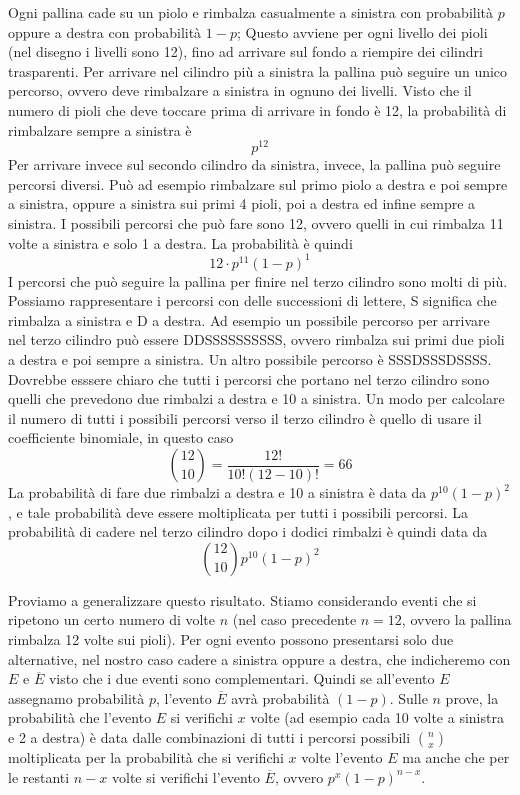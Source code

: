 Ogni pallina cade su un piolo e rimbalza casualmente a sinistra con 
probabilità \(p\) oppure a destra con probabilità \(1-p\); Questo avviene per 
ogni livello dei pioli (nel disegno i livelli sono 12), fino ad arrivare sul 
fondo a riempire dei cilindri trasparenti.
Per arrivare nel cilindro più a sinistra la pallina può seguire un unico 
percorso, ovvero deve rimbalzare a sinistra in ognuno dei livelli. 
Visto che il numero di pioli che deve toccare prima di arrivare in fondo è 
12, la probabilità di rimbalzare sempre a sinistra è \[p^{12}\]
Per arrivare invece sul secondo cilindro da sinistra, invece, la pallina può 
seguire percorsi diversi. Può ad esempio rimbalzare sul primo piolo a destra 
e poi sempre a sinistra, oppure a sinistra sui primi 4 pioli, poi a destra ed 
infine sempre a sinistra. I possibili percorsi che può fare sono 12, ovvero 
quelli in cui rimbalza 11 volte a sinistra e solo 1 a destra. La probabilità 
è quindi
\[12 \cdot p^{11}(1-p)^1\]
I percorsi che può seguire la pallina per finire nel terzo cilindro sono 
molti di più. Possiamo rappresentare i percorsi con delle successioni di 
lettere, S significa che rimbalza a sinistra e D a destra. Ad esempio un 
possibile percorso per arrivare nel terzo cilindro può essere
DDSSSSSSSSSS, ovvero rimbalza sui primi due pioli a destra e poi sempre a 
sinistra. Un altro possibile percorso è SSSDSSSDSSSS. Dovrebbe esssere chiaro 
che tutti i percorsi che portano nel terzo cilindro sono quelli che prevedono 
due rimbalzi a destra e 10 a sinistra. Un modo per calcolare il numero di 
tutti i possibili percorsi verso il terzo cilindro è quello di usare il 
coefficiente binomiale, in questo caso
\[ \binom{12}{10}=\dfrac{12!}{10!(12-10)!}=66\]
La probabilità di fare due rimbalzi a destra e 10 a sinistra è data da
\(p^{10}(1-p)^2\), e tale probabilità deve essere moltiplicata per tutti i 
possibili percorsi. La probabilità di cadere nel terzo cilindro dopo i dodici 
rimbalzi è quindi data da
\[ \binom{12}{10} p^{10}(1-p)^2\]

Proviamo a generalizzare questo risultato. Stiamo considerando eventi che si 
ripetono un certo numero di volte \(n\) (nel caso precedente \(n=12\), ovvero la 
pallina rimbalza 12 volte sui pioli). Per ogni evento possono presentarsi 
solo due alternative, nel nostro caso cadere a sinistra oppure a destra, che 
indicheremo con \(E\) e \(\overline E\) visto che i due eventi sono complementari.
Quindi se all'evento \(E\) assegnamo probabilità \(p\), l'evento \(\overline E\) 
avrà probabilità \((1-p)\).
Sulle \(n\) prove, la probabilità che l'evento \(E\) si verifichi \(x\) volte (ad 
esempio cada 10 volte a sinistra e 2 a destra) è data dalle combinazioni di 
tutti i percorsi possibili \(\binom{n}{x}\) moltiplicata per la probabilità che 
si verifichi \(x\) volte l'evento \(E\) ma anche che per le restanti \(n-x\) volte 
si verifichi l'evento \(\overline E\), ovvero \(p^x(1-p)^{n-x}\).


